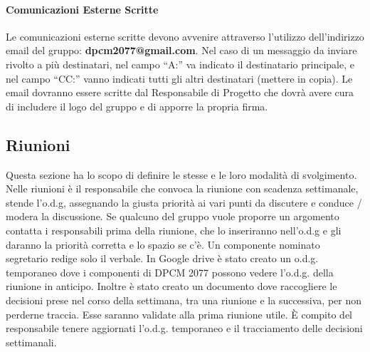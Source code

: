 \paragraph{Comunicazioni Esterne Scritte}
Le comunicazioni esterne scritte devono avvenire attraverso l’utilizzo dell’indirizzo email del gruppo: \textbf{dpcm2077@gmail.com}. 
Nel caso di un messaggio da inviare rivolto a più destinatari, nel campo “A:” va indicato il destinatario principale, e nel campo “CC:” vanno indicati tutti gli altri destinatari (mettere in copia).
Le email dovranno essere scritte dal Responsabile di Progetto che dovrà avere cura di includere il logo del gruppo e di apporre la propria firma.

\subsection{Riunioni}
Questa sezione ha lo scopo di definire le stesse e le loro modalità di svolgimento. Nelle riunioni è il responsabile che convoca la riunione con scadenza settimanale, stende l'o.d.g, assegnando la giusta priorità ai vari punti da discutere e conduce / modera la discussione. Se qualcuno del gruppo vuole proporre un argomento contatta i responsabili prima della riunione, che lo inseriranno nell'o.d.g e gli daranno la priorità corretta e lo spazio se c'è. Un componente nominato segretario redige solo il verbale.
In Google drive è stato creato un o.d.g. temporaneo dove i componenti di DPCM 2077 possono vedere l’o.d.g. della riunione in anticipo. Inoltre è stato creato un documento dove raccogliere le decisioni prese nel corso della settimana, tra una riunione e la successiva, per non perderne traccia. Esse saranno validate alla prima riunione utile. È compito del responsabile tenere aggiornati l'o.d.g. temporaneo e il tracciamento delle decisioni settimanali.
